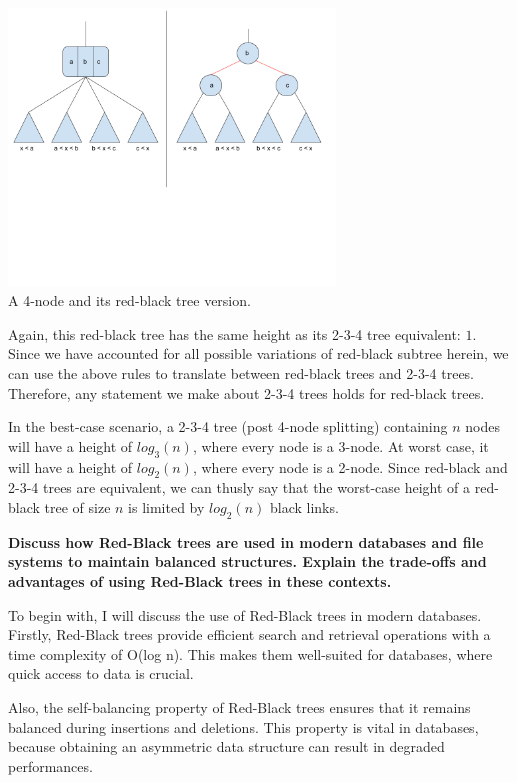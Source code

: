 \documentclass[12pt]{amsart}
\begin{document}
\begin{center}
    \includegraphics[width=0.65\textwidth]{rb_tree_2} \\
    A 4-node and its red-black tree version. \\
    \vskip 1cm
\end{center}

    Again, this red-black tree has the same height as its 2-3-4
    tree equivalent: $1$. Since we have accounted for all
    possible variations of red-black subtree herein, we can use
    the above rules to translate between red-black trees and
    2-3-4 trees. Therefore, any statement we make about 2-3-4
    trees holds for red-black trees.

    In the best-case scenario, a 2-3-4 tree (post 4-node
    splitting) containing $n$ nodes will have a height of
    $log_3(n)$, where every node is a 3-node. At worst case, it
    will have a height of $log_2(n)$, where every node is a
    2-node. Since red-black and 2-3-4 trees are equivalent, we
    can thusly say that the worst-case height of a red-black
    tree of size $n$ is limited by $log_2(n)$ black links.

    \newpage
    \textbf{Discuss how Red-Black trees are used in modern
    databases and file systems to maintain balanced structures.
    Explain the trade-offs and advantages of using Red-Black
    trees in these contexts.}

    To begin with, I will discuss the use of Red-Black trees in modern databases.
    Firstly, Red-Black trees provide efficient search and retrieval operations with a time complexity of O(log n). This makes them well-suited for databases, where quick access to data is crucial.
    
    Also, the self-balancing property of Red-Black trees ensures that it remains balanced during insertions and deletions. This property is vital in databases, because obtaining an asymmetric data structure can result in degraded performances.
    
\end{document}
